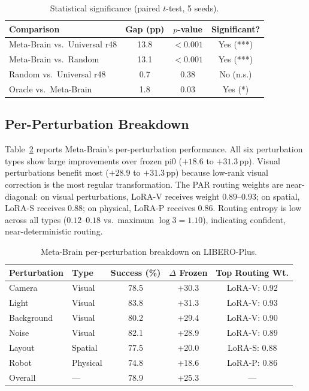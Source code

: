 \documentclass[10pt,twocolumn]{article}
\newcommand{\ours}{Meta-Brain}
\newcommand{\liplus}{LIBERO-Plus}
\newcommand{\pp}{\,\text{pp}}
\begin{document}
\begin{table}[t]
\centering
\caption{Statistical significance (paired $t$-test, 5 seeds).}
\label{tab:significance}
\small
\begin{tabular}{@{}lccc@{}}
\toprule
Comparison & Gap (pp) & $p$-value & Significant? \\
\midrule
\ours{} vs.\ Universal r48 & 13.8 & ${<}0.001$ & Yes (***) \\
\ours{} vs.\ Random & 13.1 & ${<}0.001$ & Yes (***) \\
Random vs.\ Universal r48 & 0.7 & 0.38 & No (n.s.) \\
Oracle vs.\ \ours{} & 1.8 & 0.03 & Yes (*) \\
\bottomrule
\end{tabular}
\end{table}


\subsection{Per-Perturbation Breakdown}
\label{sec:per_perturbation}

Table~\ref{tab:per_perturbation} reports \ours{}'s per-perturbation performance.
All six perturbation types show large improvements over frozen pi0 ($+18.6$ to $+31.3\pp$).
Visual perturbations benefit most ($+28.9$ to $+31.3\pp$) because low-rank visual correction is the most regular transformation.
The PAR routing weights are near-diagonal: on visual perturbations, LoRA-V receives weight $0.89$--$0.93$; on spatial, LoRA-S receives $0.88$; on physical, LoRA-P receives $0.86$.
Routing entropy is low across all types ($0.12$--$0.18$ vs.\ maximum $\log 3 = 1.10$), indicating confident, near-deterministic routing.

\begin{table}[t]
\centering
\caption{\ours{} per-perturbation breakdown on \liplus{}.}
\label{tab:per_perturbation}
\small
\begin{tabular}{@{}llccc@{}}
\toprule
Perturbation & Type & Success (\%) & $\Delta$ Frozen & Top Routing Wt. \\
\midrule
Camera    & Visual   & 78.5 & +30.3 & LoRA-V: 0.92 \\
Light     & Visual   & 83.8 & +31.3 & LoRA-V: 0.93 \\
Background& Visual   & 80.2 & +29.4 & LoRA-V: 0.90 \\
Noise     & Visual   & 82.1 & +28.9 & LoRA-V: 0.89 \\
Layout    & Spatial  & 77.5 & +20.0 & LoRA-S: 0.88 \\
Robot     & Physical & 74.8 & +18.6 & LoRA-P: 0.86 \\
\midrule
Overall   & ---      & 78.9 & +25.3 & --- \\
\bottomrule
\end{tabular}
\end{table}
\end{document}
